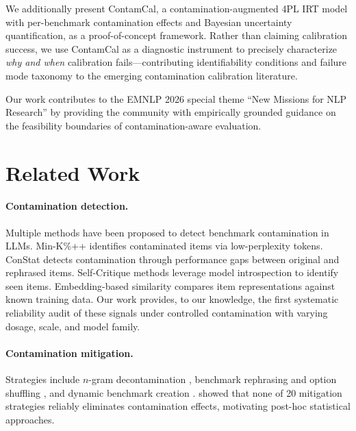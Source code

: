 \documentclass[11pt]{article}
\newcommand{\ours}{ContamCal}
\begin{document}
We additionally present \ours{}, a contamination-augmented 4PL IRT model with per-benchmark contamination effects and Bayesian uncertainty quantification, as a proof-of-concept framework.
Rather than claiming calibration success, we use \ours{} as a diagnostic instrument to precisely characterize \emph{why and when} calibration fails---contributing identifiability conditions and failure mode taxonomy to the emerging contamination calibration literature.

Our work contributes to the EMNLP 2026 special theme ``New Missions for NLP Research'' by providing the community with empirically grounded guidance on the feasibility boundaries of contamination-aware evaluation.


\section{Related Work}

\paragraph{Contamination detection.}
Multiple methods have been proposed to detect benchmark contamination in LLMs.
Min-K\%++ \citep{shi2024detecting} identifies contaminated items via low-perplexity tokens.
ConStat \citep{dekoninck2024constat} detects contamination through performance gaps between original and rephrased items.
Self-Critique methods leverage model introspection to identify seen items.
Embedding-based similarity compares item representations against known training data.
Our work provides, to our knowledge, the first systematic reliability audit of these signals under controlled contamination with varying dosage, scale, and model family.

\paragraph{Contamination mitigation.}
Strategies include $n$-gram decontamination \citep{brown2020language}, benchmark rephrasing and option shuffling \citep{xu2024benchmarking}, and dynamic benchmark creation \citep{white2024livebench}.
\citet{xu2024benchmarking} showed that none of 20 mitigation strategies reliably eliminates contamination effects, motivating post-hoc statistical approaches.
\end{document}
